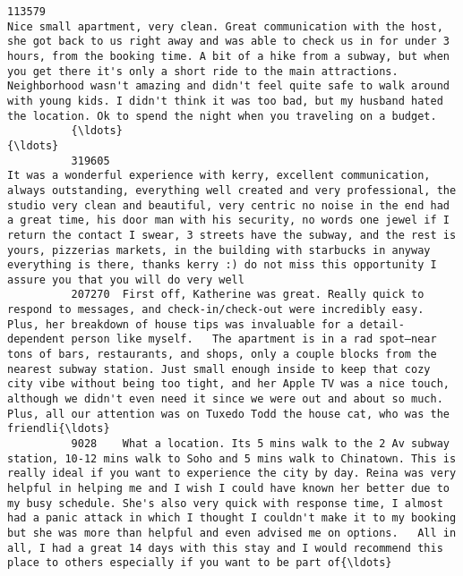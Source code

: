 \documentclass[11pt]{article}
\begin{document}
\begin{Verbatim}[commandchars=\\\{\}]
          113579                                                                                                                            Nice small apartment, very clean. Great communication with the host, she got back to us right away and was able to check us in for under 3 hours, from the booking time. A bit of a hike from a subway, but when you get there it's only a short ride to the main attractions. Neighborhood wasn't amazing and didn't feel quite safe to walk around with young kids. I didn't think it was too bad, but my husband hated the location. Ok to spend the night when you traveling on a budget.   
          {\ldots}                                                                                                                                                                                                                                                                                                                                                                                                                                                                                                                                                                                                                         {\ldots}   
          319605                                                                                It was a wonderful experience with kerry, excellent communication, always outstanding, everything well created and very professional, the studio very clean and beautiful, very centric no noise in the end had a great time, his door man with his security, no words one jewel if I return the contact I swear, 3 streets have the subway, and the rest is yours, pizzerias markets, in the building with starbucks in anyway everything is there, thanks kerry :) do not miss this opportunity I assure you that you will do very well   
          207270  First off, Katherine was great. Really quick to respond to messages, and check-in/check-out were incredibly easy. Plus, her breakdown of house tips was invaluable for a detail-dependent person like myself.   The apartment is in a rad spot—near tons of bars, restaurants, and shops, only a couple blocks from the nearest subway station. Just small enough inside to keep that cozy city vibe without being too tight, and her Apple TV was a nice touch, although we didn't even need it since we were out and about so much. Plus, all our attention was on Tuxedo Todd the house cat, who was the friendli{\ldots}   
          9028    What a location. Its 5 mins walk to the 2 Av subway station, 10-12 mins walk to Soho and 5 mins walk to Chinatown. This is really ideal if you want to experience the city by day. Reina was very helpful in helping me and I wish I could have known her better due to my busy schedule. She's also very quick with response time, I almost had a panic attack in which I thought I couldn't make it to my booking but she was more than helpful and even advised me on options.   All in all, I had a great 14 days with this stay and I would recommend this place to others especially if you want to be part of{\ldots}   

\end{Verbatim}
\end{document}
